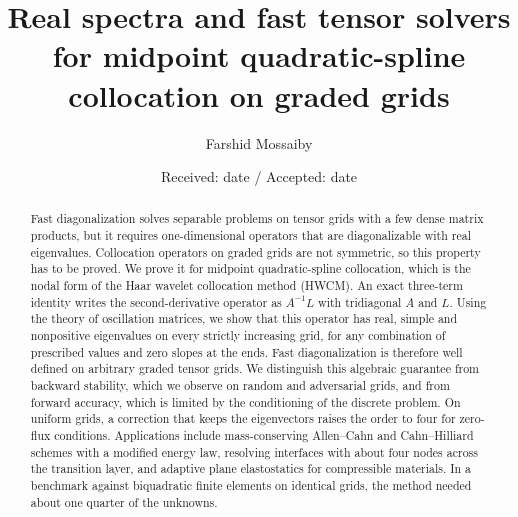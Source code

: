 \documentclass[smallextended,envcountsame]{svjour3}
\begin{document}
\title{Real spectra and fast tensor solvers for midpoint quadratic-spline collocation on graded grids}

\author{Farshid Mossaiby}


\date{Received: date / Accepted: date}

\maketitle

\begin{abstract}
Fast diagonalization solves separable problems on tensor grids with a few dense matrix products, but it
requires one-dimensional operators that are diagonalizable with real eigenvalues. Collocation operators
on graded grids are not symmetric, so this property has to be proved. We prove it for midpoint
quadratic-spline collocation, which is the nodal form of the Haar wavelet collocation method (HWCM). An
exact three-term identity writes the second-derivative operator as $A^{-1}L$ with tridiagonal $A$ and $L$.
Using the theory of oscillation matrices, we show that this operator has real, simple and nonpositive
eigenvalues on every strictly increasing grid, for any combination of prescribed values and zero slopes
at the ends. Fast diagonalization is therefore well defined on arbitrary graded tensor grids. We
distinguish this algebraic guarantee from backward stability, which we observe on random and adversarial
grids, and from forward accuracy, which is limited by the conditioning of the discrete problem. On
uniform grids, a correction that keeps the eigenvectors raises the order to four for zero-flux
conditions. Applications include mass-conserving Allen--Cahn and Cahn--Hilliard schemes with a modified
energy law, resolving interfaces with about four nodes across the transition layer, and adaptive plane
elastostatics for compressible materials. In a benchmark against biquadratic finite elements on
identical grids, the method needed about one quarter of the unknowns.
\end{abstract}
\end{document}
